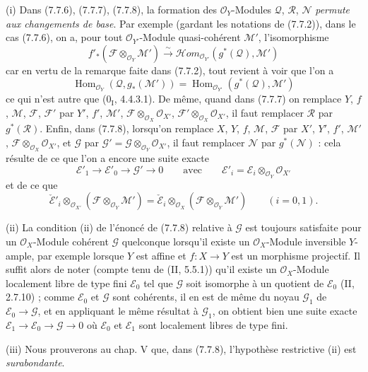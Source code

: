 \begin{remarks}[7.7.9]
\textnormal{(i)} Dans (7.7.6), (7.7.7), (7.7.8), la formation des
$\mathscr O_Y$-Modules $\mathscr Q$, $\mathscr R$, $\mathscr N$ \emph{permute aux
changements de base}. Par exemple (gardant les notations de (7.7.2)), dans le
cas (7.7.6), on a, pour tout $\mathscr O_{Y'}$-Module quasi-cohérent
$\mathscr M'$, l'isomorphisme
\[
  f'_*(\mathscr F\otimes_{\mathscr O_Y}\mathscr M')
  \xrightarrow{\sim}
  \mathscr{H}\!om_{\mathscr O_{Y'}}(g^*(\mathscr Q),\mathscr M')
\]
car en vertu de la remarque faite dans (7.7.2), tout revient à voir que l'on a
\[
  \operatorname{Hom}_{\mathscr O_Y}(\mathscr Q,g_*(\mathscr M'))
  =
  \operatorname{Hom}_{\mathscr O_{Y'}}(g^*(\mathscr Q),\mathscr M')
\]
ce qui n'est autre que ($0_{\mathrm I}$, 4.4.3.1). De même, quand dans (7.7.7)
on remplace $Y$, $f$, $\mathscr M$, $\mathscr F$, $\mathscr F'$ par $Y'$, $f'$,
$\mathscr M'$, $\mathscr F\otimes_{\mathscr O_X}\mathscr O_{X'}$,
$\mathscr F'\otimes_{\mathscr O_X}\mathscr O_{X'}$, il faut remplacer
$\mathscr R$ par $g^*(\mathscr R)$. Enfin, dans (7.7.8), lorsqu'on remplace $X$,
$Y$, $f$, $\mathscr M$, $\mathscr F$ par $X'$, $Y'$, $f'$, $\mathscr M'$,
$\mathscr F\otimes_{\mathscr O_X}\mathscr O_{X'}$, et $\mathscr G$ par
$\mathscr G'=\mathscr G\otimes_{\mathscr O_Y}\mathscr O_{X'}$, il faut remplacer
$\mathscr N$ par $g^*(\mathscr N)$ : cela résulte de ce que l'on a encore une
suite exacte
\[
  \mathscr E'_1\longrightarrow
  \mathscr E'_0\longrightarrow
  \mathscr G'\longrightarrow0
  \qquad\text{avec}\qquad
  \mathscr E'_i=\mathscr E_i\otimes_{\mathscr O_Y}\mathscr O_{X'}
\]
et de ce que
\[
  \check{\mathscr E}'_i
  \otimes_{\mathscr O_{X'}}
  (\mathscr F\otimes_{\mathscr O_Y}\mathscr M')
  =
  \check{\mathscr E}_i
  \otimes_{\mathscr O_X}
  (\mathscr F\otimes_{\mathscr O_Y}\mathscr M')
  \qquad(i=0,1).
\]

\medskip
\textnormal{(ii)} La condition (ii) de l'énoncé de (7.7.8) relative à
$\mathscr G$ est toujours satisfaite pour un $\mathscr O_X$-Module cohérent
$\mathscr G$ quelconque lorsqu'il existe un $\mathscr O_X$-Module inversible
$Y$-ample, par exemple lorsque $Y$ est affine et $f:X\to Y$ est un morphisme
projectif. Il suffit alors de noter (compte tenu de (II, 5.5.1)) qu'il existe un
$\mathscr O_X$-Module localement libre de type fini $\mathscr E_0$ tel que
$\mathscr G$ soit isomorphe à un quotient de $\mathscr E_0$ (II, 2.7.10) ; comme
$\mathscr E_0$ et $\mathscr G$ sont cohérents, il en est de même du noyau
$\mathscr G_1$ de $\mathscr E_0\to\mathscr G$, et en appliquant le même résultat
à $\mathscr G_1$, on obtient bien une suite exacte
$\mathscr E_1\to\mathscr E_0\to\mathscr G\to0$ où $\mathscr E_0$ et
$\mathscr E_1$ sont localement libres de type fini.

\medskip
\textnormal{(iii)} Nous prouverons au chap. V que, dans (7.7.8), l'hypothèse
restrictive (ii) est \emph{surabondante}.
\end{remarks}

